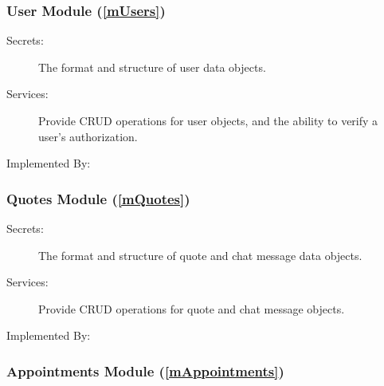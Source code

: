 \documentclass[12pt, titlepage]{article}
\newcommand{\mref}[1]{M\ref{#1}}
\begin{document}


\subsubsection{User Module (\ref{mUsers})}

\begin{description}
	\item[Secrets:] The format and structure of user data objects.
	\item[Services:] Provide CRUD operations for user objects, and the ability to verify a user's
		authorization.
	\item[Implemented By:] \progname{}
\end{description}

\subsubsection{Quotes Module (\ref{mQuotes})}

\begin{description}
	\item[Secrets:] The format and structure of quote and chat message data objects.
	\item[Services:] Provide CRUD operations for quote and chat message objects.
	\item[Implemented By:] \progname{}
\end{description}

\subsubsection{Appointments Module (\ref{mAppointments})}
\end{document}
